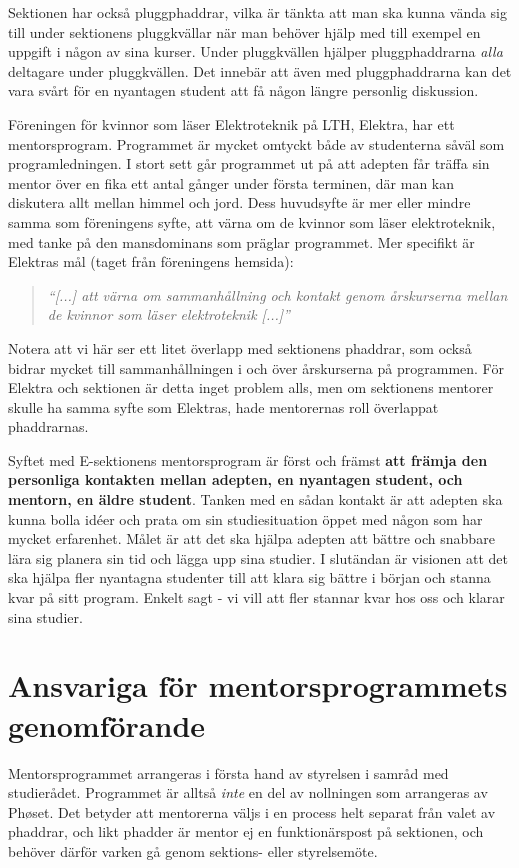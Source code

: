 \documentclass[10pt]{article}
\begin{document}
    Sektionen har också pluggphaddrar, vilka är tänkta att man ska kunna vända sig till under sektionens pluggkvällar när man behöver hjälp med till exempel en uppgift i någon av sina kurser.
    Under pluggkvällen hjälper pluggphaddrarna \emph{alla} deltagare under pluggkvällen.
    Det innebär att även med pluggphaddrarna kan det vara svårt för en nyantagen student att få någon längre personlig diskussion.

    Föreningen för kvinnor som läser Elektroteknik på LTH, Elektra, har ett mentorsprogram.
    Programmet är mycket omtyckt både av studenterna såväl som programledningen.
    I stort sett går programmet ut på att adepten får träffa sin mentor över en fika ett antal gånger under första terminen, där man kan diskutera allt mellan himmel och jord.
    Dess huvudsyfte är mer eller mindre samma som föreningens syfte, att värna om de kvinnor som läser elektroteknik, med tanke på den mansdominans som präglar programmet.
    Mer specifikt är Elektras mål (taget från föreningens hemsida):
    \begin{quote}
    \emph{``[...] att värna om sammanhållning och kontakt genom årskurserna mellan de kvinnor som läser elektroteknik [...]''}
    \end{quote}
    Notera att vi här ser ett litet överlapp med sektionens phaddrar, som också bidrar mycket till sammanhållningen i och över årskurserna på programmen.
    För Elektra och sektionen är detta inget problem alls, men om sektionens mentorer skulle ha samma syfte som Elektras, hade mentorernas roll överlappat phaddrarnas.

    Syftet med E-sektionens mentorsprogram är först och främst \textbf{att främja den personliga kontakten mellan adepten, en nyantagen student, och mentorn, en äldre student}.
    Tanken med en sådan kontakt är att adepten ska kunna bolla idéer och prata om sin studiesituation öppet med någon som har mycket erfarenhet.
    Målet är att det ska hjälpa adepten att bättre och snabbare lära sig planera sin tid och lägga upp sina studier.
    I slutändan är visionen att det ska hjälpa fler nyantagna studenter till att klara sig bättre i början och stanna kvar på sitt program.
    Enkelt sagt - vi vill att fler stannar kvar hos oss och klarar sina studier.

    \newpage

    \section{Ansvariga för mentorsprogrammets genomförande}
    Mentorsprogrammet arrangeras i första hand av styrelsen i samråd med studierådet.
    Programmet är alltså \emph{inte} en del av nollningen som arrangeras av Ph\o set.
    Det betyder att mentorerna väljs i en process helt separat från valet av phaddrar, och likt phadder är mentor ej en funktionärspost på sektionen, och behöver därför varken gå genom sektions- eller styrelsemöte.
\end{document}
